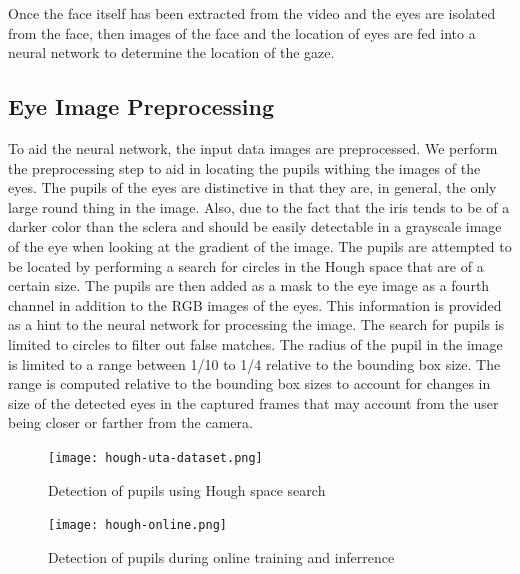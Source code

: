 \documentclass[10pt,twocolumn,letterpaper]{article}
\begin{document}
Once the face itself has been extracted from the video and the eyes
are isolated from the face, then images  of the face and the location
of eyes are fed into a neural network to determine the location of the
gaze.

\subsection{Eye Image Preprocessing}
To aid the neural network, the input data images are preprocessed. We
perform the preprocessing step to aid in locating the pupils withing
the images of the eyes. The pupils of the eyes are distinctive in that
they are, in general, the only large round thing in the image. Also,
due to the fact that the iris tends to be of a darker color than the
sclera and should be easily detectable in a grayscale image of the
eye when looking at the gradient of the image. The pupils are
attempted to be located by performing a search for circles in the
Hough space that are of a certain size. The pupils are then added as a
mask to the eye image as a fourth channel in addition to the RGB
images of the eyes. This information is provided as a hint to the
neural network for processing the image. The search for pupils is
limited to circles to filter out false matches. The radius of the pupil
in the image is limited to a range between 1/10 to 1/4 relative to the
bounding box size. The range is computed relative to the bounding box
sizes to account for changes in size of the detected eyes in the
captured frames that may account from the user being closer or farther
from the camera. 

\begin{figure}[!h]
  \begin{center}
    \texttt{[image: hough-uta-dataset.png]}
    \caption{Detection of pupils using Hough space search}
    \label{fig:hough-pupils-uta}
  \end{center}
\end{figure}

\begin{figure}[!h]
  \begin{center}
    \texttt{[image: hough-online.png]}
    \caption{Detection of pupils during online training and
      inferrence}
    \label{fig:hough-online}
  \end{center}
\end{figure}
\end{document}
